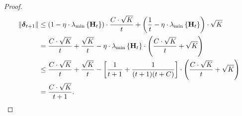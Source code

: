 \documentclass[10pt]{article}
\begin{document}
\begin{proof}
\begin{equation*}
\begin{split}
    \left\| {\boldsymbol{\delta}}_{t+1} \right\| &\le \left( 1 - \eta \cdot \lambda_{\min}\left\{ {\mathbf{H}}_t \right\} \right) \cdot \frac{C \cdot \sqrt{K}}{t} + \left( \frac{1}{t} - \eta \cdot \lambda_{\min}\left\{ {\mathbf{H}}_t \right\} \right) \cdot \sqrt{K} \\
    &= \frac{C \cdot \sqrt{K}}{t} + \frac{\sqrt{K}}{t} - \eta \cdot \lambda_{\min}\left\{ {\mathbf{H}}_t \right\} \cdot \left( \frac{C \cdot \sqrt{K}}{t} + \sqrt{K} \right) \\
    &\le \frac{C \cdot \sqrt{K}}{t} + \frac{\sqrt{K}}{t} - \left[ \frac{1}{t+1} + \frac{1}{(t+1)(t+C)} \right] \cdot \left( \frac{C \cdot \sqrt{K}}{t} + \sqrt{K} \right) \\
    &= \frac{C \cdot \sqrt{K}}{t+1}. \qedhere
\end{split}
\end{equation*}
\end{proof}

\fi


\end{document}
